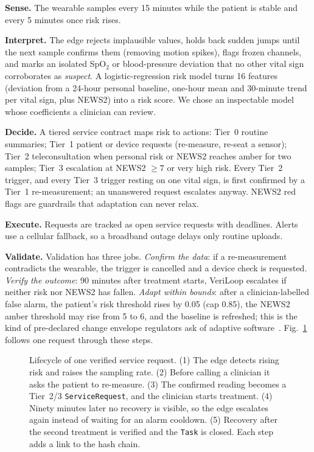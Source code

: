 \documentclass[journal,twoside,web]{IEEEmiot}
\begin{document}
\textbf{Sense.} The wearable samples every 15 minutes while the patient is stable and every 5 minutes once risk rises.

\textbf{Interpret.} The edge rejects implausible values, holds back sudden jumps until the next sample confirms them
(removing motion spikes), flags frozen channels, and marks an isolated SpO$_2$ or blood-pressure deviation that no other
vital sign corroborates as \emph{suspect}. A logistic-regression risk model turns 16 features (deviation from a 24-hour
personal baseline, one-hour mean and 30-minute trend per vital sign, plus NEWS2) into a risk score. We chose an
inspectable model whose coefficients a clinician can review.

\textbf{Decide.} A tiered service contract maps risk to actions: Tier~0 routine summaries; Tier~1 patient or device
requests (re-measure, re-seat a sensor); Tier~2 teleconsultation when personal risk or NEWS2 reaches amber for two
samples; Tier~3 escalation at NEWS2 $\geq 7$ or very high risk. Every Tier~2 trigger, and every Tier~3 trigger resting
on one vital sign, is first confirmed by a Tier~1 re-measurement; an unanswered request escalates anyway. NEWS2 red flags
are guardrails that adaptation can never relax.

\textbf{Execute.} Requests are tracked as open service requests with deadlines. Alerts use a cellular fallback, so a
broadband outage delays only routine uploads.

\textbf{Validate.} Validation has three jobs. \emph{Confirm the data}: if a re-measurement contradicts the wearable, the
trigger is cancelled and a device check is requested. \emph{Verify the outcome}: 90 minutes after treatment starts,
VeriLoop escalates if neither risk nor NEWS2 has fallen. \emph{Adapt within bounds}: after a clinician-labelled false
alarm, the patient's risk threshold rises by 0.05 (cap 0.85), the NEWS2 amber threshold may rise from 5 to 6, and the
baseline is refreshed; this is the kind of pre-declared change envelope regulators ask of adaptive
software~\cite{fda2021}. Fig.~\ref{fig:lifecycle} follows one request through these steps.

\begin{figure}[t]
\centering
\resizebox{\textwidth}{!}{}
\caption{Lifecycle of one verified service request. (1) The edge detects rising risk and raises the sampling rate.
(2) Before calling a clinician it asks the patient to re-measure. (3) The confirmed reading becomes a Tier~2/3
\texttt{ServiceRequest}, and the clinician starts treatment. (4) Ninety minutes later no recovery is visible, so the
edge escalates again instead of waiting for an alarm cooldown. (5) Recovery after the second treatment is verified and
the \texttt{Task} is closed. Each step adds a link to the hash chain.}
\label{fig:lifecycle}
\end{figure}
\end{document}
